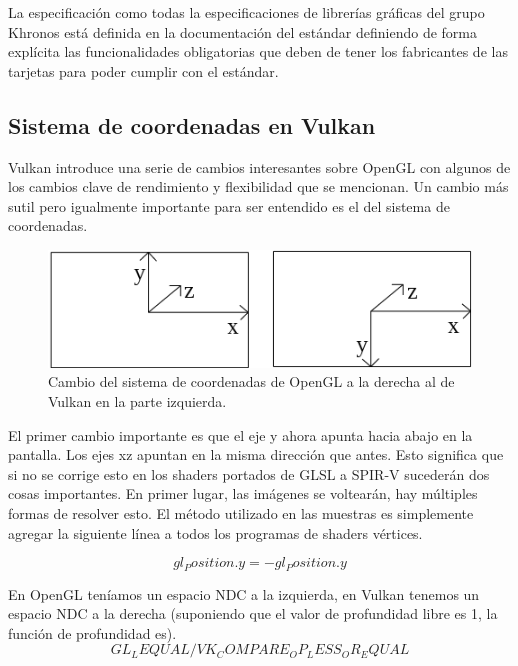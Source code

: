 \documentclass[a4paper, 17pt]{book}
\begin{document}
La especificación como todas la especificaciones de librerías gráficas del grupo Khronos está definida en la documentación
del estándar definiendo de forma explícita las funcionalidades obligatorias que deben de tener los fabricantes de las tarjetas
para poder cumplir con el estándar.


\subsection{Sistema de coordenadas en Vulkan} 
\label{subsec:SysVulkan}

Vulkan introduce una serie de cambios interesantes sobre OpenGL con algunos de los cambios clave de rendimiento y flexibilidad
que se mencionan. Un cambio más sutil pero igualmente importante para ser entendido es el del sistema de coordenadas.

\begin{figure}[hbt!]
    \centering
    \includegraphics[scale=0.75, keepaspectratio]{img/coordinateDiagram.png}
    \caption{Cambio del sistema de coordenadas de OpenGL a la derecha al de Vulkan en la parte izquierda.}
    \label{figura:khronos}
\end{figure}

El primer cambio importante es que el eje y ahora apunta hacia abajo en la pantalla. Los ejes xz apuntan en la misma
dirección que antes. Esto significa que si no se corrige esto en los shaders portados de GLSL a SPIR-V sucederán dos
cosas importantes. En primer lugar, las imágenes se voltearán, hay múltiples formas de resolver esto. El método
utilizado en las muestras es simplemente agregar la siguiente línea a todos los programas de shaders vértices.

\begin{equation}
gl_Position.y = -gl_Position.y
\end{equation}

En OpenGL teníamos un espacio NDC a la izquierda, en Vulkan tenemos un espacio NDC a la derecha (suponiendo que el valor
de profundidad libre es 1, la función de profundidad es). \begin{equation} GL_LEQUAL / VK_COMPARE_OP_LESS_OR_EQUAL \end{equation}
\end{document}
